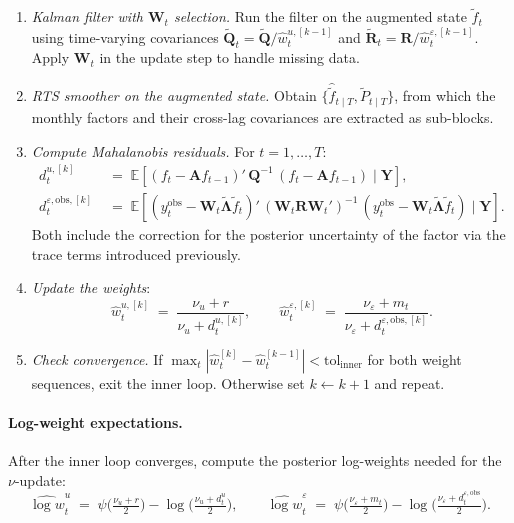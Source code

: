\documentclass[11pt, a4paper, oneside]{article}
\newcommand{\mL}{\boldsymbol{\Lambda}}
\begin{document}
\begin{enumerate}[leftmargin=1.5em, itemsep=3pt]
    \item \emph{Kalman filter with $\mathbf{W}_t$ selection.}
          Run the filter on the augmented state $\tilde{f}_t$ using
          time-varying covariances
          $\tilde{\mathbf{Q}}_t = \tilde{\mathbf{Q}} / \hat{w}^{u,[k-1]}_t$
          and $\tilde{\mathbf{R}}_t = \mathbf{R} / \hat{w}^{\varepsilon,[k-1]}_t$.
          Apply $\mathbf{W}_t$ in the update step to handle missing data.
    \item \emph{RTS smoother on the augmented state.}
          Obtain $\{\hat{\tilde{f}}_{t \mid T}, \tilde{P}_{t \mid T}\}$,
          from which the monthly factors and their cross-lag
          covariances are extracted as sub-blocks.
    \item \emph{Compute Mahalanobis residuals.}
          For $t = 1, \ldots, T$:
          \begin{align*}
          d^{u,[k]}_t &\;=\; \mathbb{E}[(f_t - \mathbf{A} f_{t-1})'\,\mathbf{Q}^{-1}\,(f_t - \mathbf{A} f_{t-1}) \mid \mathbf{Y}], \\[3pt]
          d^{\varepsilon,\mathrm{obs},[k]}_t &\;=\; \mathbb{E}[(y_t^{\mathrm{obs}} - \mathbf{W}_t \tilde{\mL} \tilde{f}_t)'\, (\mathbf{W}_t \mathbf{R} \mathbf{W}_t')^{-1}\, (y_t^{\mathrm{obs}} - \mathbf{W}_t \tilde{\mL} \tilde{f}_t) \mid \mathbf{Y}].
          \end{align*}
          Both include the correction for the posterior uncertainty of
          the factor via the trace terms introduced previously.
          
    \item \emph{Update the weights}:
          \[
          \hat{w}^{u,[k]}_t \;=\; \frac{\nu_u + r}{\nu_u + d^{u,[k]}_t},
          \qquad
          \hat{w}^{\varepsilon,[k]}_t \;=\; \frac{\nu_\varepsilon + m_t}{\nu_\varepsilon + d^{\varepsilon,\mathrm{obs},[k]}_t}.
          \]
    \item \emph{Check convergence.} If
          $\max_t |\hat{w}^{[k]}_t - \hat{w}^{[k-1]}_t| < \mathrm{tol}_{\text{inner}}$
          for both weight sequences, exit the inner loop. Otherwise
          set $k \leftarrow k + 1$ and repeat.
\end{enumerate}

\paragraph{Log-weight expectations.}
After the inner loop converges, compute the posterior log-weights
needed for the $\nu$-update:
\[
\widehat{\log w}^{u}_t \;=\; \psi\!\big(\tfrac{\nu_u + r}{2}\big) - \log\!\big(\tfrac{\nu_u + d^u_t}{2}\big),
\qquad
\widehat{\log w}^{\varepsilon}_t \;=\; \psi\!\big(\tfrac{\nu_\varepsilon + m_t}{2}\big) - \log\!\big(\tfrac{\nu_\varepsilon + d^{\varepsilon,\mathrm{obs}}_t}{2}\big).
\]
\end{document}
